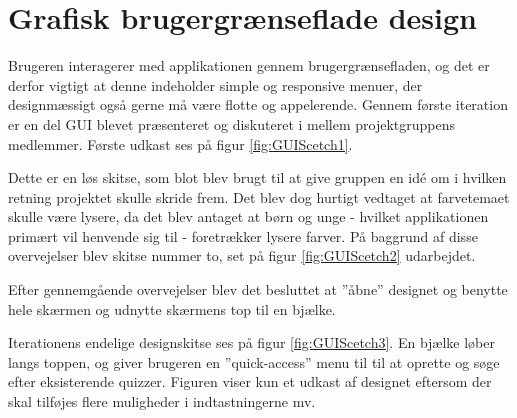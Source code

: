 \section{Grafisk brugergrænseflade design}
Brugeren interagerer med applikationen gennem brugergrænsefladen, og det er derfor vigtigt at denne indeholder simple og responsive menuer, der designmæssigt også gerne må være flotte og appelerende.  
Gennem første iteration er en del GUI blevet præsenteret og diskuteret i mellem projektgruppens medlemmer. Første udkast ses på figur \ref{fig:GUIScetch1}.


Dette er en løs skitse, som blot blev brugt til at give gruppen en idé om i hvilken retning projektet skulle skride frem. Det blev dog hurtigt vedtaget at farvetemaet skulle være lysere, da det blev antaget at børn og unge - hvilket applikationen primært vil henvende sig til - foretrækker lysere farver.
På baggrund af disse overvejelser blev skitse nummer to, set på figur \ref{fig:GUIScetch2} udarbejdet.


Efter gennemgående overvejelser blev det  besluttet at ''åbne'' designet og benytte hele skærmen og udnytte skærmens top til en bjælke.


Iterationens endelige designskitse ses på figur \ref{fig:GUIScetch3}. En bjælke løber langs toppen, og giver brugeren en ''quick-access'' menu til til at oprette og søge efter eksisterende quizzer. Figuren viser kun et udkast af designet eftersom der skal tilføjes flere muligheder i indtastningerne mv.
